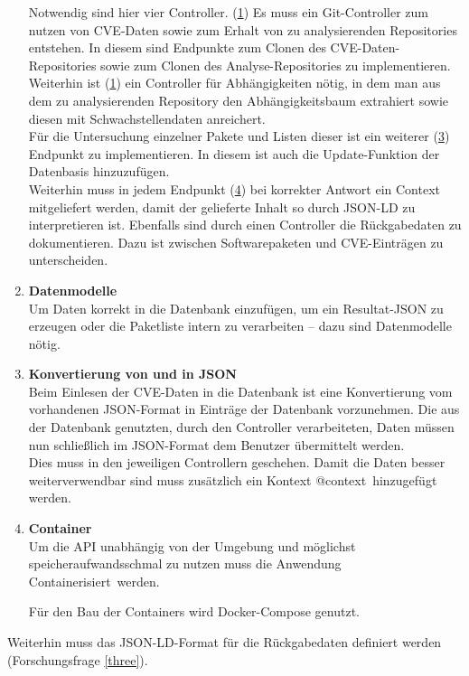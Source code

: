 \begin{enumerate}
            Notwendig sind hier vier Controller.
            (\hyperref[api_controller:one]{1}) Es muss ein Git-Controller zum nutzen von \ac{CVE}-Daten sowie zum Erhalt von zu analysierenden Repositories entstehen.
            In diesem sind Endpunkte zum Clonen des \ac{CVE}-Daten-Repositories sowie zum Clonen des Analyse-Repositories zu implementieren. %
            \\
            Weiterhin ist (\hyperref[api_controller:two]{1}) ein Controller für Abhängigkeiten nötig, in dem man aus dem zu analysierenden Repository den Abhängigkeitsbaum extrahiert sowie diesen mit Schwachstellendaten anreichert.
            \\
            Für die Untersuchung einzelner Pakete und Listen dieser ist ein weiterer (\hyperref[api_controller:three]{3}) Endpunkt zu implementieren.
            In diesem ist auch die Update-Funktion der Datenbasis hinzuzufügen.
            \\
            Weiterhin muss in jedem Endpunkt (\hyperref[api_controller:four]{4}) bei korrekter Antwort ein Context mitgeliefert werden, damit der gelieferte Inhalt so durch JSON-LD zu interpretieren ist.
            Ebenfalls sind durch einen Controller die Rückgabedaten zu dokumentieren.
            Dazu ist zwischen Softwarepaketen und \ac{CVE}-Einträgen zu unterscheiden.
        \item \textbf{Datenmodelle} \label{arch_4}\\
            Um Daten korrekt in die Datenbank einzufügen, um ein Resultat-JSON zu erzeugen oder die Paketliste intern zu verarbeiten -- dazu sind Datenmodelle nötig.
        \item \textbf{Konvertierung von und in JSON} \label{arch_5}\\
            Beim Einlesen der \ac{CVE}-Daten in die Datenbank ist eine Konvertierung vom vorhandenen JSON-Format in Einträge der Datenbank vorzunehmen.
            Die aus der Datenbank genutzten, durch den Controller verarbeiteten, Daten müssen nun schließlich im JSON-Format dem Benutzer übermittelt werden.
            \\
            Dies muss in den jeweiligen Controllern geschehen.
            Damit die Daten besser weiterverwendbar sind muss zusätzlich ein Kontext \glqq @context\grqq~hinzugefügt werden.
        \item \textbf{Container} \\
            Um die \ac{API} unabhängig von der Umgebung und möglichst speicheraufwandsschmal zu nutzen muss die Anwendung \glqq Containerisiert\grqq~werden.

            Für den Bau der Containers wird Docker-Compose genutzt.
    \end{enumerate}
    Weiterhin muss das JSON-LD-Format für die Rückgabedaten definiert werden (Forschungsfrage \ref{three}).
